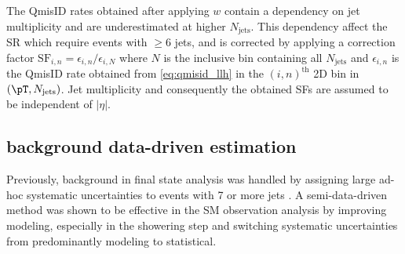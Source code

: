 \documentclass[../thesis.tex]{subfiles}
\begin{document}
The \acs{QmisID} rates obtained after applying $w$ contain a dependency on jet multiplicity and are underestimated at higher $N_\text{jets}$. This dependency affect the \acs{SR} which require events with $\geq 6$ jets, and is corrected by applying a correction factor $\text{SF}_{i,n} = \epsilon_{i,n}/\epsilon_{i,N}$ where $N$ is the inclusive bin containing all $N_\text{jets}$ and $\epsilon_{i,n}$ is the \acs{QmisID} rate obtained from \autoref{eq:qmisid_llh} in the $(i,n)^\text{th}$ 2D bin in $(\pT, N_\text{jets})$. Jet multiplicity and consequently the obtained \acs{SF}s are assumed to be independent of $|\eta|$.




\subsection{\ttW background data-driven estimation}
\label{sec:ttW_BG}
Previously, \ttW background in \tttt final state analysis was handled by assigning large ad-hoc systematic uncertainties to \ttW events with 7 or more jets \citep{tttt_evidence}. A semi-data-driven method \citep{ana:r_par_susy_2021} was shown to be effective in the SM \tttt observation analysis \citep{tttt_obs} by improving \ttW modeling, especially in the showering step and switching \ttW systematic uncertainties from predominantly modeling to statistical.
\end{document}
